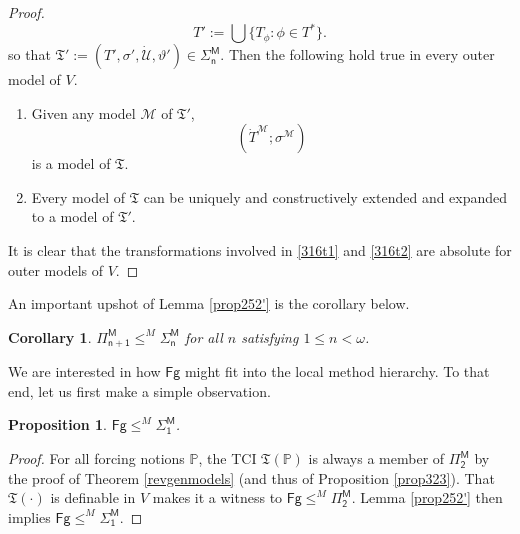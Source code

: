 \documentclass[12pt, twoside]{memoir}
\numberwithin{equation}{section}
\newtheorem{prop}[thm]{Proposition}
\newtheorem{cor}[thm]{Corollary}
\theoremstyle{definition}
\theoremstyle{remark}
\theoremstyle{definition}
\theoremstyle{definition}
\theoremstyle{definition}
\theoremstyle{remark}
\begin{document}
\begin{proof}
\begin{equation*}
    T' := \bigcup \{T_{\phi} : \phi \in T^*\} \text{.}
\end{equation*}
so that $\mathfrak{T}' := (T', \sigma', \dot{\mathcal{U}}, \vartheta') \in \mathsf{\Sigma^M_n}$. Then the following hold true in every outer model of $V$.
\begin{enumerate}[label=(T\arabic*)]
    \item\label{316t1} Given any model $\mathcal{M}$ of $\mathfrak{T}'$,
    \begin{equation*}
        (\dot{T}^{\mathcal{M}}; \sigma^{\mathcal{M}})
    \end{equation*} 
    is a model of $\mathfrak{T}$. 
    \item\label{316t2} Every model of $\mathfrak{T}$ can be uniquely and constructively extended and expanded to a model of $\mathfrak{T}'$.
\end{enumerate}
It is clear that the transformations involved in \ref{316t1} and \ref{316t2} are absolute for outer models of $V$.
\end{proof}

An important upshot of Lemma \ref{prop252'} is the corollary below.

\begin{cor}
$\mathsf{\Pi^M_{n+1}} \leq^M \mathsf{\Sigma^M_n}$ for all $n$ satisfying $1 \leq n < \omega$.
\end{cor}

We are interested in how $\mathsf{Fg}$ might fit into the local method hierarchy. To that end, let us first make a simple observation.

\begin{prop}\label{prop343}
$\mathsf{Fg} \leq^M \mathsf{\Sigma^M_1}$.
\end{prop}

\begin{proof}
For all forcing notions $\mathbb{P}$, the TCI $\mathfrak{T}(\mathbb{P})$ is always a member of $\mathsf{\Pi^M_2}$ by the proof of Theorem \ref{revgenmodels} (and thus of Proposition \ref{prop323}). That $\mathfrak{T}(\cdot)$ is definable in $V$ makes it a witness to $\mathsf{Fg} \leq^M \mathsf{\Pi^M_2}$. Lemma \ref{prop252'} then implies $\mathsf{Fg} \leq^M \mathsf{\Sigma^M_1}$.
\end{proof}
\end{document}
